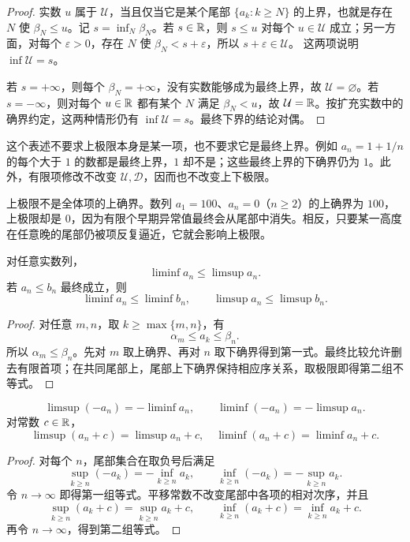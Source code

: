 \begin{proof}
实数 \(u\) 属于 \(\mathcal U\)，当且仅当它是某个尾部
\(\{a_k:k\ge N\}\) 的上界，也就是存在 \(N\) 使
\(\beta_N\le u\)。记 \(s=\inf_N\beta_N\)。若 \(s\in\mathbb{R}\)，则
\(s\le u\) 对每个 \(u\in\mathcal U\) 成立；另一方面，对每个
\(\varepsilon>0\)，存在 \(N\) 使
\(\beta_N<s+\varepsilon\)，所以 \(s+\varepsilon\in\mathcal U\)。
这两项说明 \(\inf\mathcal U=s\)。

若 \(s=+\infty\)，则每个 \(\beta_N=+\infty\)，没有实数能够成为最终上界，故 \(\mathcal U=\varnothing\)。若 \(s=-\infty\)，则对每个
\(u\in\mathbb{R}\) 都有某个 \(N\) 满足 \(\beta_N<u\)，故
\(\mathcal U=\mathbb{R}\)。按扩充实数中的确界约定，这两种情形仍有
\(\inf\mathcal U=s\)。最终下界的结论对偶。
\end{proof}

这个表述不要求上极限本身是某一项，也不要求它是最终上界。例如
\(a_n=1+1/n\) 的每个大于 \(1\) 的数都是最终上界，\(1\) 却不是；这些最终上界的下确界仍为 \(1\)。此外，有限项修改不改变
\(\mathcal U,\mathcal D\)，因而也不改变上下极限。

上极限不是全体项的上确界。数列 \(a_1=100\)、\(a_n=0\)（\(n\ge2\)）的上确界为 \(100\)，上极限却是 \(0\)，因为有限个早期异常值最终会从尾部中消失。相反，只要某一高度在任意晚的尾部仍被项反复逼近，它就会影响上极限。

\begin{theorem}[基本序关系]
对任意实数列，
\[
 \liminf a_n\le\limsup a_n.
\]
若 \(a_n\le b_n\) 最终成立，则
\[
 \liminf a_n\le\liminf b_n,\qquad
 \limsup a_n\le\limsup b_n.
\]
\end{theorem}

\begin{proof}
对任意 \(m,n\)，取 \(k\ge\max\{m,n\}\)，有
\[
 \alpha_m\le a_k\le\beta_n.
\]
所以 \(\alpha_m\le\beta_n\)。先对 \(m\) 取上确界、再对 \(n\) 取下确界得到第一式。最终比较允许删去有限首项；在共同尾部上，尾部上下确界保持相应序关系，取极限即得第二组不等式。
\end{proof}

\begin{proposition}
\[
 \limsup(-a_n)=-\liminf a_n,\qquad
 \liminf(-a_n)=-\limsup a_n.
\]
对常数 \(c\in\mathbb{R}\)，
\[
 \limsup(a_n+c)=\limsup a_n+c,
\quad
 \liminf(a_n+c)=\liminf a_n+c.
\]
\end{proposition}

\begin{proof}
对每个 \(n\)，尾部集合在取负号后满足
\[
 \sup_{k\ge n}(-a_k)=-\inf_{k\ge n}a_k,
 \qquad
 \inf_{k\ge n}(-a_k)=-\sup_{k\ge n}a_k.
\]
令 \(n\to\infty\) 即得第一组等式。平移常数不改变尾部中各项的相对次序，并且
\[
 \sup_{k\ge n}(a_k+c)=\sup_{k\ge n}a_k+c,
 \qquad
 \inf_{k\ge n}(a_k+c)=\inf_{k\ge n}a_k+c.
\]
再令 \(n\to\infty\)，得到第二组等式。
\end{proof}

